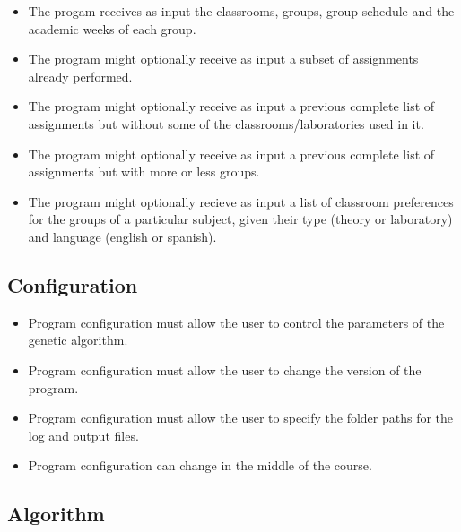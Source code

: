 \begin{itemize}
    \item The progam receives as input the classrooms, groups, group schedule and the academic weeks of each group.
    \item The program might optionally receive as input a subset of assignments already performed.
    \item The program might optionally receive as input a previous complete list of assignments but without some of the classrooms/laboratories used in it.
    \item The program might optionally receive as input a previous complete list of assignments but with more or less groups.
    \item The program might optionally recieve as input a list of classroom preferences for the groups of a particular subject, given their type (theory or laboratory) and language (english or spanish).
\end{itemize}

\subsection{Configuration}

\begin{itemize}
    \item Program configuration must allow the user to control the parameters of the genetic algorithm.
    \item Program configuration must allow the user to change the version of the program.
    \item Program configuration must allow the user to specify the folder paths for the log and output files.
    \item Program configuration can change in the middle of the course.
\end{itemize}

\subsection{Algorithm}

